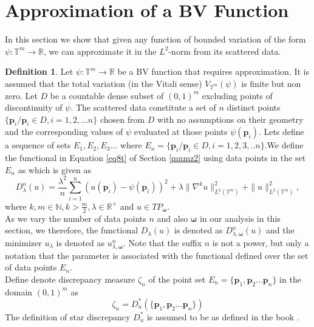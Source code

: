 \documentclass[multixcb]{amstext-l}
\theoremstyle{plain}
\theoremstyle{definition}
\theoremstyle{definition}
\newtheorem{definition}[theorem]{Definition}
\theoremstyle{remark}
\numberwithin{equation}{chapter}
\begin{document}
\section{Approximation of a BV Function}
In this section we show that given any function of bounded variation of the form $\psi:\mathbb{T}^m\to\mathbb{R}$, we can approximate it in the $L^2$-norm from its scattered data.

\begin{definition}\label{theorem_defs2}
Let $\psi : \mathbb{T}^m\to\mathbb{R}$ be a BV function that requires approximation. It is assumed that the total variation (in the Vitali sense) $V_{\mathbb{T}^m}(\psi)$ is finite but non zero. Let $D$ be a countable dense subset of $(0,1)^m$ excluding points of discontinuity of $\psi$. The scattered data constitute a set of $n$ distinct points $\{\boldsymbol{p}_i/\boldsymbol{p}_i\in D, i=1,2,\ldots n\}$ chosen from $D$ with no assumptions on their geometry and the corresponding values of $\psi$ evaluated at those points $\psi(\boldsymbol{p}_i)$. Lets define a sequence of sets $E_1,E_2,E_3\ldots$ where $E_n = \{\boldsymbol{p}_i/\boldsymbol{p}_i\in D, i = 1,2,3,..n\}$.We define the functional in Equation \ref{eq8t} of Section \ref{mnmz2} using data points in the set $E_n$ as which is given as
\begin{equation}\label{functional_redef}
    D_{\lambda}^n(u) = \frac{\lambda^2}{n}\sum\limits_{i=1}^{n}(u(\boldsymbol{p}_i)-\psi(\boldsymbol{p}_i))^2 + \lambda\|\nabla^k u\|_{L^2(\mathbb{T}^m)}^2 + \|u\|_{L^2(\mathbb{T}^m)}^2, \end{equation}
where $k,m \in \mathbb{N}, k>\frac{m}{2}, 
\lambda \in \mathbb{R}^+ \mbox{ and } u \in TP_{\boldsymbol{\omega}}$.\\
As we vary the number of data points $n$ and also $\boldsymbol{\omega}$ in our analysis in this section, we therefore, the functional $D_{\lambda}(u)$ is denoted as $D^n_{\lambda,\boldsymbol{\omega}}(u)$ and the minimizer $u_{\lambda}$ is denoted as $u^n_{\lambda,\boldsymbol{\omega}}$. Note that the suffix $n$ is not a power, but only a notation that the parameter is associated with the functional defined over the set of data points $E_n$.\\

Define denote discrepancy measure $\zeta_n$ of the point set $E_n=\{\boldsymbol{p}_1,\boldsymbol{p}_2...\boldsymbol{p}_n\}$ in the domain $(0,1)^m$ as \begin{equation}\label{Disc}\zeta_n = D_n^*(\{\boldsymbol{p}_1,\boldsymbol{p}_2...\boldsymbol{p}_n\})
\end{equation} The definition of star discrepancy $D_n^*$ is assumed to be as defined in the book \cite{kuipers2012uniform}.
\end{definition}
\end{document}
